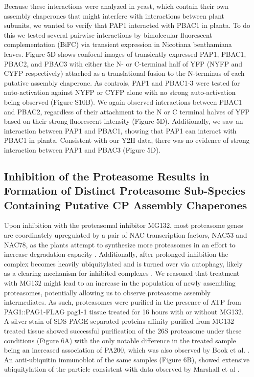	Because these interactions were analyzed in yeast, which contain their own assembly chaperones that might interfere with interactions between plant subunits, we wanted to verify that PAP1 interacted with PBAC1 in planta. To do this we tested several pairwise interactions by bimolecular fluorescent complementation (BiFC) via transient expression in Nicotiana benthamiana leaves. Figure 5D shows confocal images of transiently expressed PAP1, PBAC1, PBAC2, and PBAC3 with either the N- or C-terminal half of YFP (NYFP and CYFP respectively) attached as a translational fusion to the N-terminus of each putative assembly chaperone. As controls, PAP1 and PBAC1-3 were tested for auto-activation against NYFP or CYFP alone with no strong auto-activation being observed (Figure S10B). We again observed interactions between PBAC1 and PBAC2, regardless of their attachment to the N or C terminal halves of YFP based on their strong fluorescent intensity (Figure 5D). Additionally, we saw an interaction between PAP1 and PBAC1, showing that PAP1 can interact with PBAC1 in planta.  Consistent with our Y2H data, there was no evidence of strong interaction between PAP1 and PBAC3 (Figure 5D).

\subsection{Inhibition of the Proteasome Results in Formation of Distinct Proteasome Sub-Species Containing Putative CP Assembly Chaperones}
	Upon inhibition with the proteasomal inhibitor MG132, most proteasome genes are coordinately upregulated by a pair of NAC transcription factors, NAC53 and NAC78, as the plants attempt to synthesize more proteasomes in an effort to increase degradation capacity \citep{gladman16}. Additionally, after prolonged inhibition the complex becomes heavily ubiquitylated and is turned over via autophagy, likely as a clearing mechanism for inhibited complexes \citep{marshall15}. We reasoned that treatment with MG132 might lead to an increase in the population of newly assembling proteasomes, potentially allowing us to observe proteasome assembly intermediates. As such, proteasomes were purified in the presence of ATP from PAG1::PAG1-FLAG pag1-1 tissue treated for 16 hours with or without MG132. A silver stain of SDS-PAGE-separated proteins affinity-purified from MG132-treated tissue showed successful purification of the 26S proteasome under these conditions (Figure 6A) with the only notable difference in the treated sample being an increased association of PA200, which was also observed by Book et al. \citep{book10}. An anti-ubiquitin immunoblot of the same samples (Figure 6B), showed extensive ubiquitylation of the particle consistent with data observed by Marshall et al \citep{marshall15}.

